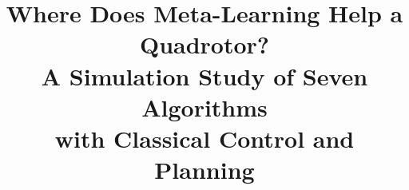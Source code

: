 \documentclass[conference]{IEEEtran}
\begin{document}
\title{Where Does Meta-Learning Help a Quadrotor?\\A Simulation Study of Seven Algorithms\\with Classical Control and Planning}

\author{
}

\maketitle













\label{pw:mainend}
\balance


\end{document}
